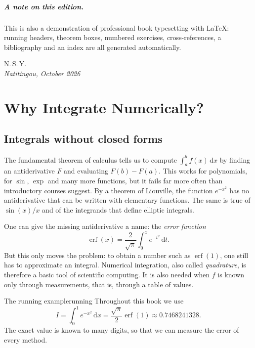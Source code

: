 \documentclass[11pt,a4paper,twoside,openright]{book}
\DeclareMathOperator{\erf}{erf}
\newcommand{\dd}{\,\mathrm{d}}
\begin{document}
\paragraph{A note on this edition.}
This is also a demonstration of professional book typesetting with \LaTeX{}: running headers, theorem boxes, numbered exercises, cross-references, a bibliography and an index are all generated automatically.

\bigskip
\hfill N.\,S.\,Y.\\
\hfill\textit{Natitingou, October 2026}

\tableofcontents
\listoffigures
\listoftables

\mainmatter

\chapter{Why Integrate Numerically?}\label{ch:intro}

\section{Integrals without closed forms}
The fundamental theorem of calculus tells us to compute $\int_a^b f(x)\dd x$ by finding an antiderivative $F$ and evaluating $F(b)-F(a)$.
This works for polynomials, for $\sin$, $\exp$ and many more functions, but it fails far more often than introductory courses suggest.
By a theorem of Liouville, the function $e^{-x^{2}}$ has no antiderivative that can be written with elementary functions.
The same is true of $\sin(x)/x$ and of the integrands that define elliptic integrals.

One can give the missing antiderivative a name: the \emph{error function}
\[
  \erf(x)=\frac{2}{\sqrt\pi}\int_0^x e^{-t^{2}}\dd t .
\]
But this only moves the problem: to obtain a number such as $\erf(1)$, one still has to approximate an integral.
Numerical integration, also called \emph{quadrature}, is therefore a basic tool of scientific computing.
It is also needed when $f$ is known only through measurements, that is, through a table of values.

\begin{example}{The running example}{running}
Throughout this book we use
\[
  I=\int_0^1 e^{-x^{2}}\dd x=\frac{\sqrt\pi}{2}\erf(1)\approx 0.7468241328 .
\]
The exact value is known to many digits, so that we can measure the error of every method.
\end{example}
\end{document}

